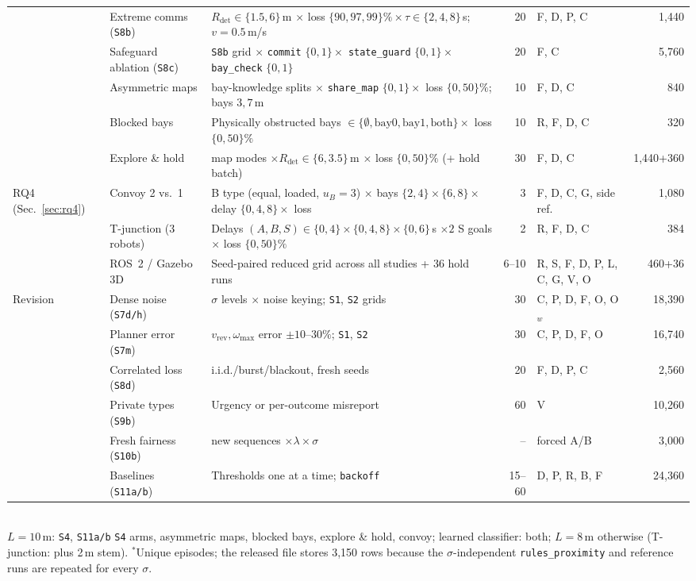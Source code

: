 \begin{table}[!t]
{\begin{tabular}{@{}ll>{\raggedright\arraybackslash}p{}rlr@{}}
 & Extreme comms (\texttt{S8b}) & $R_{\mathrm{det}}\in\{1.5,6\}$\,m $\times$ loss $\{90,97,99\}\%\times\tau\in\{2,4,8\}$\,s; $v=0.5$\,m/s & 20 & F, D, P, C & 1,440 \\
 & Safeguard ablation (\texttt{S8c}) & \texttt{S8b} grid $\times$ \texttt{commit} $\{0,1\}\times$ \texttt{state\_guard} $\{0,1\}\times$ \texttt{bay\_check} $\{0,1\}$ & 20 & F, C & 5,760 \\
 & Asymmetric maps & 7 bay-knowledge splits $\times$ \texttt{share\_map} $\{0,1\}\times$ loss $\{0,50\}\%$; bays $3,7$\,m & 10 & F, D, C & 840 \\
 & Blocked bays & Physically obstructed bays $\in\{\emptyset,\text{bay0},\text{bay1},\text{both}\}\times$ loss $\{0,50\}\%$ & 10 & R, F, D, C & 320 \\
 & Explore \& hold & 4 map modes $\times R_{\mathrm{det}}\in\{6,3.5\}$\,m $\times$ loss $\{0,50\}\%$ (+ hold batch) & 30 & F, D, C & 1,440+360 \\\midrule
\multirow{3}{*}{RQ4 (Sec.~\ref{sec:rq4})}
 & Convoy 2 vs.\ 1 & B type (equal, loaded, $u_B=3$) $\times$ bays $\{2,4\}\times\{6,8\}\times$ delay $\{0,4,8\}\times$ loss & 3 & F, D, C, G, side ref. & 1,080 \\
 & T-junction (3 robots) & Delays $(A,B,S)\in\{0,4\}\times\{0,4,8\}\times\{0,6\}$\,s $\times 2$ S goals $\times$ loss $\{0,50\}\%$ & 2 & R, F, D, C & 384 \\
 & ROS~2 / Gazebo 3D & Seed-paired reduced grid across all studies + 36 hold runs & 6--10 & R, S, F, D, P, L, C, G, V, O & 460+36 \\\midrule
\multirow{6}{*}{Revision}
 & Dense noise (\texttt{S7d/h}) & 10 $\sigma$ levels $\times$ noise keying; \texttt{S1}, \texttt{S2} grids & 30 & C, P, D, F, O, O$_w$ & 18,390 \\
 & Planner error (\texttt{S7m}) & $v_{\mathrm{rev}},\omega_{\max}$ error $\pm10$--$30\%$; \texttt{S1}, \texttt{S2} & 30 & C, P, D, F, O & 16,740 \\
 & Correlated loss (\texttt{S8d}) & i.i.d./burst/blackout, fresh seeds & 20 & F, D, P, C & 2,560 \\
 & Private types (\texttt{S9b}) & Urgency or per-outcome misreport & 60 & V & 10,260 \\
 & Fresh fairness (\texttt{S10b}) & 100 new sequences $\times\lambda\times\sigma$ & -- & forced A/B & 3,000 \\
 & Baselines (\texttt{S11a/b}) & Thresholds one at a time; \texttt{backoff} & 15--60 & D, P, R, B, F & 24,360 \\\bottomrule
\end{tabular}}\\[2pt]
{\footnotesize $L=10$\,m: \texttt{S4}, \texttt{S11a/b} \texttt{S4} arms, asymmetric maps, blocked bays, explore \& hold, convoy; learned classifier: both; $L=8$\,m otherwise (T-junction: plus 2\,m stem). $^\ast$Unique episodes; the released file stores 3,150 rows because the $\sigma$-independent \texttt{rules\_proximity} and reference runs are repeated for every $\sigma$.}
\end{table}

